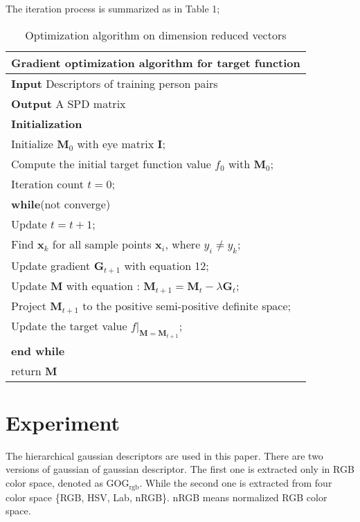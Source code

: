 \documentclass[conference,compsoc]{IEEEtran}
\begin{document}
 The iteration process is summarized as in Table 1;
 \begin{table}[H]
 \centering
 \caption{Optimization algorithm on dimension reduced vectors }
 \begin{tabular}{l}
 \hline 
 \multicolumn{1}{l}{\textbf{Gradient optimization algorithm for target function}} \\
 \hline
 \textbf{Input} Descriptors of training person pairs \\
 \textbf{Output} A SPD matrix\\
 \textbf{Initialization} \\
 Initialize $\bm{M}_0$ with eye matrix $\bm{I}$; \\
 Compute the initial target function value $f_0$ with $\bm{M}_0$;\\
 Iteration count  $t = 0$;\\

 \textbf{while}(not converge)\\
 \hspace{0.5cm} Update $t =  t + 1$;\\
\hspace{0.5cm} Find $\bm{x}_k$ for all sample points $\bm{x}_i$, where $y_i \ne y_k$;\\
\hspace{0.5cm} Update gradient $\bm{G}_{t+1}$ with equation 12;\\
\hspace{0.5cm} Update $\bm{M}$ with equation : $\bm{M}_{t+1} = \bm{M}_{t} - \lambda\bm{G}_t$;\\
\hspace{0.5cm} Project $\bm{M}_{t+1}$ to the positive semi-positive definite space; \\ 
\hspace{0.5cm} Update the target value $f|_{\bm{M} = \bm{M}_{t+1}}$;\\
 \textbf{end while}  \\
 return $\bm{M}$\\
 \hline

 \end{tabular} 
 \end{table}
 
\section{Experiment}
The hierarchical gaussian descriptors \cite{GOG} are used in this paper. There are two versions of gaussian of gaussian descriptor. The first one is extracted only in RGB color space, denoted as GOG$_\text{rgb}$. While the second one is extracted from four color space \{RGB, HSV, Lab, nRGB\}. nRGB means normalized RGB color space. 
\end{document}
